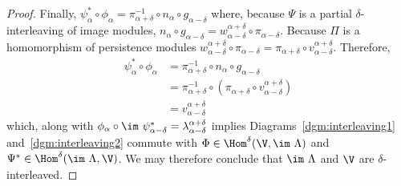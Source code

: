 \begin{proof}
  Finally, $\psi_\alpha^*\circ\phi_\alpha = \pi_{\alpha+\delta}^{-1}\circ n_\alpha\circ g_{\alpha-\delta}$ where, because $\Psi$ is a partial $\delta$-interleaving of image modules, $n_\alpha\circ g_{\alpha-\delta} = w_{\alpha-\delta}^{\alpha+\delta}\circ\pi_{\alpha-\delta}$.
  Because $\Pi$ is a homomorphism of persistence modules $w_{\alpha-\delta}^{\alpha+\delta}\circ \pi_{\alpha-\delta} = \pi_{\alpha+\delta}\circ v_{\alpha-\delta}^{\alpha+\delta}$.
  Therefore,
  \begin{align*}
    \psi_\alpha^*\circ\phi_\alpha &= \pi_{\alpha+\delta}^{-1}\circ n_\alpha\circ g_{\alpha-\delta}\\
      &= \pi_{\alpha+\delta}^{-1}\circ (\pi_{\alpha+\delta}\circ v_{\alpha-\delta}^{\alpha+\delta})\\
      &= v_{\alpha-\delta}^{\alpha+\delta}
  \end{align*}
  which, along with $\phi_\alpha\circ\im~\psi_{\alpha-\delta}^* = \lambda_{\alpha-\delta}^{\alpha+\delta}$ implies Diagrams~\ref{dgm:interleaving1} and~\ref{dgm:interleaving2} commute with $\Phi\in\Hom^\delta(\V,\im~\Lambda)$ and $\Psi^*\in\Hom^\delta(\im~\Lambda, \V)$.
  We may therefore conclude that $\im~\Lambda$ and $\V$ are $\delta$-interleaved.

\end{proof}


